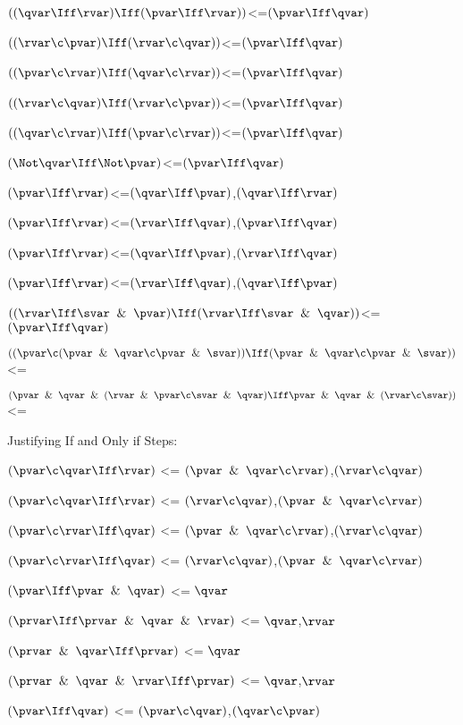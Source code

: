 $((\qvar \Iff \rvar) \Iff (\pvar \Iff \rvar))$<=$(\pvar \Iff \qvar)$

$((\rvar \c \pvar) \Iff (\rvar \c \qvar))$<=$(\pvar \Iff \qvar)$

$((\pvar \c \rvar) \Iff (\qvar \c \rvar))$<=$(\pvar \Iff \qvar)$

$((\rvar \c \qvar) \Iff (\rvar \c \pvar))$<=$(\pvar \Iff \qvar)$

$((\qvar \c \rvar) \Iff (\pvar \c \rvar))$<=$(\pvar \Iff \qvar)$

$(\Not \qvar \Iff \Not \pvar)$<=$(\pvar \Iff \qvar)$

$(\pvar \Iff \rvar)$<=$(\qvar \Iff \pvar)$,$(\qvar \Iff \rvar)$

$(\pvar \Iff \rvar)$<=$(\rvar \Iff \qvar)$,$(\pvar \Iff \qvar)$

$(\pvar \Iff \rvar)$<=$(\qvar \Iff \pvar)$,$(\rvar \Iff \qvar)$

$(\pvar \Iff \rvar)$<=$(\rvar \Iff \qvar)$,$(\qvar \Iff \pvar)$

$((\rvar \Iff \svar \And \pvar) \Iff (\rvar \Iff \svar \And \qvar))$<=$(\pvar \Iff \qvar)$

$((\pvar \c (\pvar \And \qvar \c \pvar \And \svar)) \Iff (\pvar \And \qvar \c \pvar \And \svar))$<=

$(\pvar \And \qvar \And (\rvar \And \pvar \c \svar \And \qvar) \Iff \pvar \And \qvar \And (\rvar \c \svar))$<=

\lineb



Justifying If and Only if Steps:
\lineb

$(\pvar \c \qvar \Iff \rvar)$ <= $(\pvar \And \qvar \c \rvar)$,$(\rvar \c \qvar)$

$(\pvar \c \qvar \Iff \rvar)$ <= $(\rvar \c \qvar)$,$(\pvar \And \qvar \c \rvar)$

$(\pvar \c \rvar \Iff \qvar)$ <= $(\pvar \And \qvar \c \rvar)$,$(\rvar \c \qvar)$

$(\pvar \c \rvar \Iff \qvar)$ <= $(\rvar \c \qvar)$,$(\pvar \And \qvar \c \rvar)$

$(\pvar \Iff \pvar \And \qvar)$ <= $\qvar$

$(\prvar \Iff \prvar \And \qvar \And \rvar)$ <= $\qvar$,$\rvar$

$(\prvar \And \qvar\Iff \prvar)$ <= $\qvar$

$(\prvar \And \qvar \And \rvar\Iff\prvar)$ <= $\qvar$,$\rvar$

$(\pvar \Iff \qvar)$ <= $(\pvar \c \qvar)$,$(\qvar \c \pvar)$

